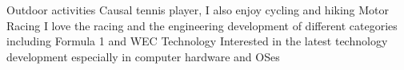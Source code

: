 



\begin{cvskills}
  \cvskill
    {Outdoor activities} %
    {Causal tennis player, I also enjoy cycling and hiking} %
  \cvskill
    {Motor Racing} %
    {I love the racing and the engineering development of different categories including Formula 1 and WEC} %
  \cvskill
    {Technology} %
    {Interested in the latest technology development especially in computer hardware and OSes} %

\end{cvskills}